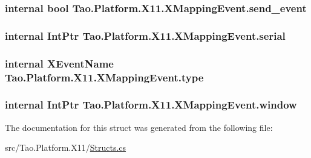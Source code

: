 \label{struct_tao_1_1_platform_1_1_x11_1_1_x_mapping_event_a014624007bbaf17cf3985f97497f6c79}
\hypertarget{struct_tao_1_1_platform_1_1_x11_1_1_x_mapping_event_aca3196b128d3235b6e773f61b32cf203}{
\subsubsection[{send\_\-event}]{\setlength{\rightskip}{0pt plus 5cm}internal bool {\bf Tao.Platform.X11.XMappingEvent.send\_\-event}}}
\label{struct_tao_1_1_platform_1_1_x11_1_1_x_mapping_event_aca3196b128d3235b6e773f61b32cf203}
\hypertarget{struct_tao_1_1_platform_1_1_x11_1_1_x_mapping_event_a8bcd76f5520f6a4f84da069b19440e35}{
\subsubsection[{serial}]{\setlength{\rightskip}{0pt plus 5cm}internal IntPtr {\bf Tao.Platform.X11.XMappingEvent.serial}}}
\label{struct_tao_1_1_platform_1_1_x11_1_1_x_mapping_event_a8bcd76f5520f6a4f84da069b19440e35}
\hypertarget{struct_tao_1_1_platform_1_1_x11_1_1_x_mapping_event_a7693e284d5f23ab8d6e9a2b801f0e367}{
\subsubsection[{type}]{\setlength{\rightskip}{0pt plus 5cm}internal {\bf XEventName} {\bf Tao.Platform.X11.XMappingEvent.type}}}
\label{struct_tao_1_1_platform_1_1_x11_1_1_x_mapping_event_a7693e284d5f23ab8d6e9a2b801f0e367}
\hypertarget{struct_tao_1_1_platform_1_1_x11_1_1_x_mapping_event_a2c678d84add70739544d45f7e1d05aaf}{
\subsubsection[{window}]{\setlength{\rightskip}{0pt plus 5cm}internal IntPtr {\bf Tao.Platform.X11.XMappingEvent.window}}}
\label{struct_tao_1_1_platform_1_1_x11_1_1_x_mapping_event_a2c678d84add70739544d45f7e1d05aaf}


The documentation for this struct was generated from the following file:\begin{DoxyCompactItemize}
\item 
src/Tao.Platform.X11/\hyperlink{_structs_8cs}{Structs.cs}\end{DoxyCompactItemize}
